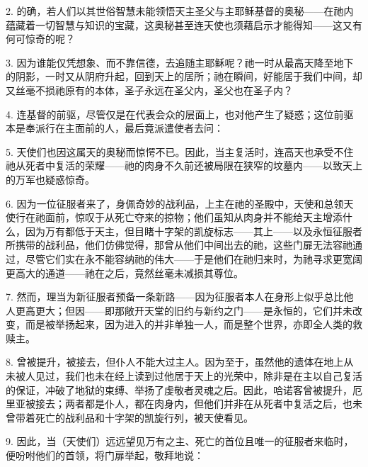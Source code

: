 2. 的确，若人们以其世俗智慧未能领悟天主圣父与主耶稣基督的奥秘——在祂内蕴藏着一切智慧与知识的宝藏，这奥秘甚至连天使也须藉启示才能得知——这又有何可惊奇的呢？\par

3. 因为谁能仅凭想象、而不靠信德，去追随主耶稣呢？祂一时从最高天降至地下的阴影，一时又从阴府升起，回到天上的居所；祂在瞬间，好能居于我们中间，却又丝毫不损祂原有的本体，圣子永远在圣父内，圣父也在圣子内？\par

4. 连基督的前驱，尽管仅是在代表会众的层面上，也对他产生了疑惑；这位前驱本是奉派行在主面前的人，最后竟派遣使者去问：\par

5. 天使们也因这属天的奥秘而惊愕不已。因此，当主复活时，连高天也承受不住祂从死者中复活的荣耀——祂的肉身不久前还被局限在狭窄的坟墓内——以致天上的万军也疑惑惊奇。\par

6. 因为一位征服者来了，身佩奇妙的战利品，上主在祂的圣殿中，天使和总领天使行在祂面前，惊叹于从死亡夺来的掠物；他们虽知从肉身并不能给天主增添什么，因为万有都低于天主，但目睹十字架的凯旋标志——其上——以及永恒征服者所携带的战利品，他们仿佛觉得，那曾从他们中间出去的祂，这些门扉无法容祂通过，尽管它们实在永不能容纳祂的伟大——于是他们在祂归来时，为祂寻求更宽阔更高大的通道——祂在之后，竟然丝毫未减损其尊位。\par

7. 然而，理当为新征服者预备一条新路——因为征服者本人在身形上似乎总比他人更高更大；但因——即那敞开天堂的旧约与新约之门——是永恒的，它们并未改变，而是被举扬起来，因为进入的并非单独一人，而是整个世界，亦即全人类的救赎主。\par

8. 曾被提升，被接去，但仆人不能大过主人。因为至于，虽然他的遗体在地上从未被人见过，我们也未在经上读到过他居于天上的光荣中，除非是在主以自己复活的保证，冲破了地狱的束缚、举扬了虔敬者灵魂之后。因此，哈诺客曾被提升，厄里亚被接去；两者都是仆人，都在肉身内，但他们并非在从死者中复活之后，也未曾带着死亡的战利品和十字架的凯旋行列，被天使看见。\par

9. 因此，当（天使们）远远望见万有之主、死亡的首位且唯一的征服者来临时，便吩咐他们的首领，将门扉举起，敬拜地说：\par

